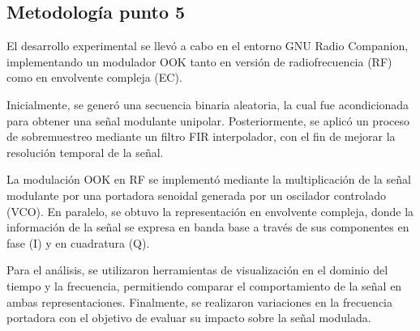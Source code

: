 \subsection{Metodología punto 5}

El desarrollo experimental se llevó a cabo en el entorno GNU Radio Companion, implementando un modulador OOK tanto en versión de radiofrecuencia (RF) como en envolvente compleja (EC).

Inicialmente, se generó una secuencia binaria aleatoria, la cual fue acondicionada para obtener una señal modulante unipolar. Posteriormente, se aplicó un proceso de sobremuestreo mediante un filtro FIR interpolador, con el fin de mejorar la resolución temporal de la señal.


La modulación OOK en RF se implementó mediante la multiplicación de la señal modulante por una portadora senoidal generada por un oscilador controlado (VCO). En paralelo, se obtuvo la representación en envolvente compleja, donde la información de la señal se expresa en banda base a través de sus componentes en fase (I) y en cuadratura (Q).

Para el análisis, se utilizaron herramientas de visualización en el dominio del tiempo y la frecuencia, permitiendo comparar el comportamiento de la señal en ambas representaciones. Finalmente, se realizaron variaciones en la frecuencia portadora con el objetivo de evaluar su impacto sobre la señal modulada.